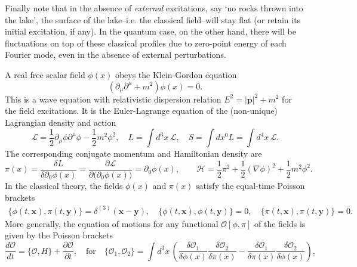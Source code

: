 \documentclass[../QFT_main.tex]{subfiles}
\begin{document}
\begin{mytheorem}
Finally note that in the absence of \emph{external} excitations, say `no rocks thrown into the lake', the surface of the lake--i.e. the classical field--will stay flat (or retain its initial excitation, if any).
In the quantum case, on the other hand, there will be fluctuations on top of these classical profiles due to zero-point energy of each Fourier mode, even in the absence of external perturbations.
%
\end{mytheorem}


\begin{mytheorem}
%
A real free scalar field $\phi(x)$ obeys the Klein-Gordon equation
\begin{equation}
    (\partial_{\mu} \partial^{\mu} + m^2) \phi(x) = 0.
\end{equation}
This is a wave equation with relativistic dispersion relation $E^2 = |\mathbf{p}|^2 + m^2$ for the field excitations.
It is the Euler-Lagrange equation of the (non-unique) Lagrangian density and action
\begin{equation}
    \mathcal{L} = \frac{1}{2} \partial_{\mu} \phi \partial^{\mu} \phi - \frac{1}{2} m^2 \phi^2, 
    \quad L=\int d^3 x\, \mathcal{L},\quad S = \int dx^0 L = \int d^4 x\, \mathcal{L}.
\end{equation}
The corresponding conjugate momentum and Hamiltonian density are 
\begin{equation}
    \pi(x) = \frac{\delta L}{\delta \partial_0 \phi(x)} = \frac{\partial \mathcal{L}}{\partial\big(\partial_0 \phi(x)\big)} = \partial_0 \phi(x), 
    \qquad 
    \mathcal{H} = \frac{1}{2} \pi^2 + \frac{1}{2} (\nabla \phi)^2 + \frac{1}{2} m^2 \phi^2.
\end{equation}
In the classical theory, the fields $\phi(x)$ and $\pi(x)$ satisfy the equal-time Poisson brackets 
\begin{align}
    \{\phi(t, \mathbf{x}), \pi(t, \mathbf{y})\} = \delta^{(3)}(\mathbf{x} - \mathbf{y}), \quad
    \{\phi(t, \mathbf{x}), \phi(t, \mathbf{y})\} = 0, \quad
    \{\pi(t, \mathbf{x}), \pi(t, \mathbf{y})\} = 0.
\end{align}
More generally, the equation of motions for any functional $\mathcal{O}[\phi, \pi]$ of the fields is given by the Poisson brackets
\begin{equation}
    \frac{d\mathcal{O}}{dt} = \{\mathcal{O}, H\} + \frac{\partial \mathcal{O}}{\partial t},
    \quad \text{for}\quad
    \{\mathcal{O}_1,\mathcal{O}_2\} = \int d^3 x\, \left( \frac{\delta \mathcal{O}_1}{\delta \phi(x)} \frac{\delta \mathcal{O}_2}{\delta \pi(x)} - \frac{\delta \mathcal{O}_1}{\delta \pi(x)} \frac{\delta \mathcal{O}_2}{\delta \phi(x)} \right),

\end{equation}
\end{mytheorem}
\end{document}
